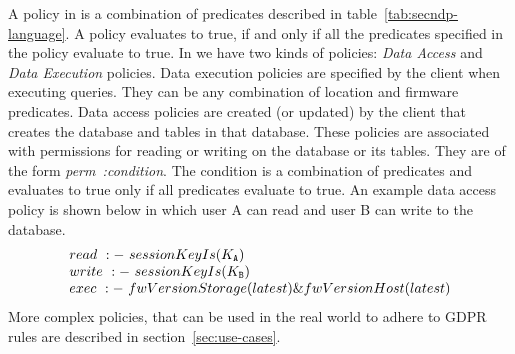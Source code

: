 A policy in \project{} is a combination of predicates described in table~\ref{tab:secndp-language}. A policy evaluates to true, if and only if all the predicates specified in the policy evaluate to true. In \project{} we have two kinds of policies: \emph{Data Access} and \emph{Data Execution} policies. Data execution policies are specified by the client when executing queries. They can be any combination of location and firmware predicates. Data access policies are created (or updated) by the client that creates the database and tables in that database. These policies are associated with permissions for reading or writing on the database or its tables. They are of the form \textit{perm~:condition}. The condition is a combination of predicates and evaluates to true only if all predicates evaluate to true. An example data access policy is shown below in which user A can read and user B can write to the database.
\[
\begin{array}{@{}l@{}}
read~:-~sessionKeyIs(K_{\tt A})\\
write~:-~sessionKeyIs(K_{\tt B})\\
exec~:-~fwVersionStorage(latest) \& fwVersionHost(latest)\\
\end{array}
\]
More complex policies, that can be used in the real world to adhere to GDPR rules are described in section~\ref{sec:use-cases}.